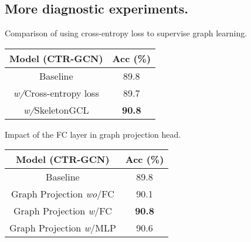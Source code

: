 \documentclass{article} \usepackage{iclr2023_conference,times}
\begin{document}
\subsection{More diagnostic experiments.}
\label{app:diagnostic experiments}
\begin{minipage}{\textwidth}
\begin{minipage}[t]{0.45\textwidth}
\centering
\makeatletter{}
\setlength\tabcolsep{2.5pt}
   \scriptsize
   \caption{Comparison of using cross-entropy loss to supervise graph learning.}
    \begin{tabular}{c||c}
\rowcolor{gray!30} Model (CTR-GCN) & Acc (\%) \\
       \hline
        Baseline & 89.8 \\\hline
        \textit{w/}Cross-entropy loss & 89.7 \\
        \textit{w/}SkeletonGCL & \textbf{90.8} \\\hline
    \end{tabular}
\label{table:using cross-entropy loss.}
\end{minipage}
\hspace{3mm}
\begin{minipage}[t]{0.5\textwidth}
\centering
\setlength\tabcolsep{2pt}
\makeatletter{}
\setlength\tabcolsep{2.5pt}
   \scriptsize
   \caption{Impact of the FC layer in graph projection head.}
    \begin{tabular}{c||c}
\rowcolor{gray!30} Model (CTR-GCN) & Acc (\%) \\
       \hline \hline
        Baseline & 89.8 \\\hline
        Graph Projection \textit{wo}/FC & 90.1 \\
        Graph Projection \textit{w}/FC & \textbf{90.8} \\\hline
        Graph Projection \textit{w}/MLP & 90.6 \\
        \hline
    \end{tabular}
    \label{table:fc_project_head}
\end{minipage}


\end{minipage}
\end{document}
